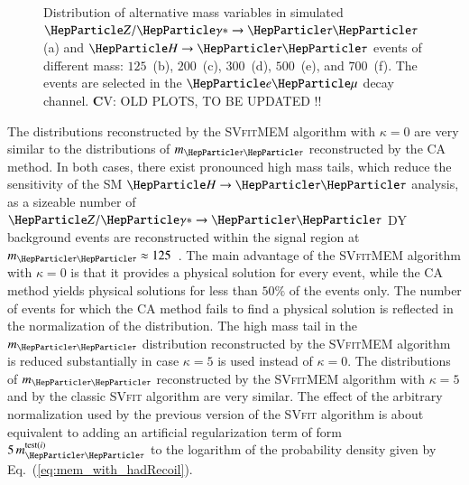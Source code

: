\begin{figure}
\begin{center}
\end{center}
\caption{
  Distribution of alternative mass variables in simulated $\PZ/\Pggx
  \to \Pgt\Pgt$ (a) and $\PHiggs \to \Pgt\Pgt$ events of different mass:
  $125$~\GeV (b), $200$~\GeV (c), $300$~\GeV (d), $500$~\GeV (e), and
  $700$~\GeV (f).
  The events are selected in the $\Pe\Pgm$ decay channel.
  {\textbf CV: OLD PLOTS, TO BE UPDATED !!}
}
\label{fig:massDistributions_emu}
\end{figure}

The distributions reconstructed by the \textsc{SVfitMEM} algorithm with $\kappa = 0$ are very similar to the distributions of $m_{\Pgt\Pgt}$ reconstructed by the CA method.
In both cases, there exist pronounced high mass tails, which reduce the sensitivity of the SM $\PHiggs \to \Pgt\Pgt$ analysis,
as a sizeable number of $\PZ/\Pggx \to \Pgt\Pgt$ DY background events
are reconstructed within the signal region at $m_{\Pgt\Pgt} \approx 125$~\GeV.
The main advantage of the \textsc{SVfitMEM} algorithm with $\kappa =
0$ is that it provides a physical solution for every event,
while the CA method yields physical solutions for less than $50\%$ of
the events only.
The number of events for which the CA method fails to find a physical solution is reflected in the normalization of the distribution.
The high mass tail in the $m_{\Pgt\Pgt}$ distribution reconstructed by
the \textsc{SVfitMEM} algorithm is reduced substantially in case
$\kappa = 5$ is used instead of $\kappa = 0$.
The distributions of $m_{\Pgt\Pgt}$ reconstructed by the \textsc{SVfitMEM} algorithm with $\kappa = 5$ and by the classic \textsc{SVfit} algorithm are very similar.
The effect of the arbitrary normalization used by the previous version
of the \textsc{SVfit} algorithm is about equivalent to adding 
an artificial regularization term of form $5 \,
m_{\Pgt\Pgt}^{\textrm{test}(i)}$ to the logarithm of the probability
density given by Eq.~(\ref{eq:mem_with_hadRecoil}).

